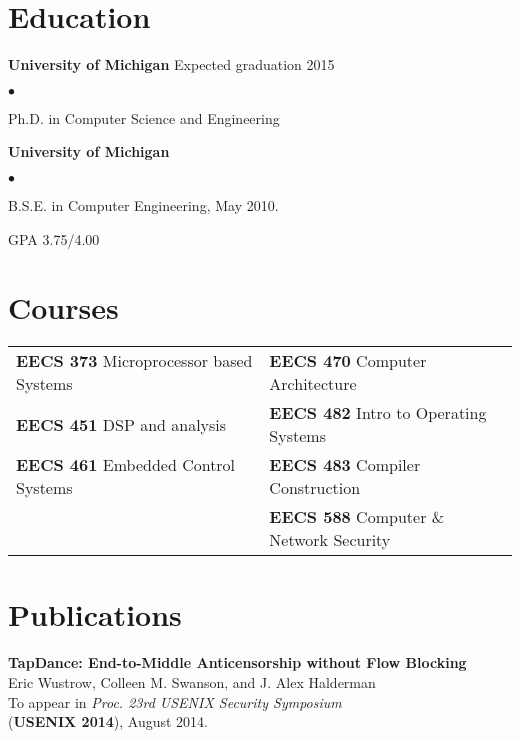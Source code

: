 \documentclass{res}
\newcommand{\sqitem}{\item[\tiny$\blacksquare$]}
\newcommand{\sqlist}{\begin{list}{$\bullet$}
  { \setlength{\itemsep}{0pt}
	\setlength{\parsep}{0pt}
	\setlength{\topsep}{0pt}
	\setlength{\partopsep}{0pt}
	\setlength{\leftmargin}{6.0em}
	\setlength{\labelsep}{2.5em} } }
\newcommand{\sqend}{\end{list}}
\begin{document}

\address{\emph{Current Address}	\\
			1885 Fuller Rd	\\
			Ann Arbor, MI 48105			\\
										\\
			phone: 734.330.8702			\\
			email: ewust@umich.edu}

\begin{resume}

\section{Education}
	\textbf{University of Michigan}  Expected graduation 2015%
	\sqlist	
		\sqitem Ph.D. in Computer Science and Engineering 
	\sqend

	\textbf{University of Michigan}
	\sqlist
		\sqitem B.S.E. in Computer Engineering, May 2010.
		\sqitem GPA 3.75/4.00
	\sqend

\section{Courses}
	\begin{tabular}{l l}
	\textbf{EECS 373} Microprocessor based Systems & 
					\textbf{EECS 470} Computer Architecture \\
	\textbf{EECS 451} DSP and analysis & 
					\textbf{EECS 482} Intro to Operating Systems \\
	\textbf{EECS 461} Embedded Control Systems & 
					\textbf{EECS 483} Compiler Construction \\
											  &
					\textbf{EECS 588} Computer \& Network Security \\
	\end{tabular}
\fi

\section{Publications}

    \textbf{TapDance: End-to-Middle Anticensorship without Flow Blocking} \\
    Eric Wustrow, Colleen M. Swanson, and J. Alex Halderman \\
    To appear in \emph{Proc. 23rd USENIX Security Symposium} \\
    (\textbf{USENIX 2014}), August 2014.


\end{resume}
\end{document}
